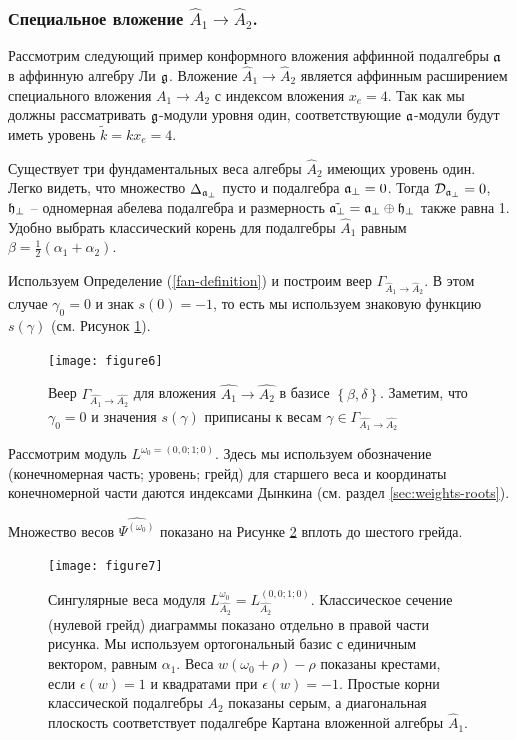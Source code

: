 \subsubsection{Специальное вложение $\hat{A}_1\rightarrow\hat{A}_2$.}
\label{sec:spec-embedd-hata_1s}
Рассмотрим следующий пример конформного вложения  аффинной подалгебры $\mathfrak{a}$ в  аффинную алгебру Ли $\mathfrak{g}$. Вложение $\hat{A}_1 \rightarrow \hat{A}_2$ является аффинным расширением специального вложения $A_1 \rightarrow A_2$ с индексом вложения $x_e=4$. Так как мы должны рассматривать $\mathfrak{g}$-модули уровня один, соответствующие  $\mathfrak{a}$-модули будут иметь уровень $\tilde{k}=kx_e=4$.

Существует три фундаментальных веса алгебры  $\hat{A}_2$ имеющих уровень один. 
Легко видеть, что множество $\Delta_{ \mathfrak{a}_{\perp} }$ пусто и подалгебра $\mathfrak{a}_{\perp}=0$. Тогда ${\cal D}_{\mathfrak{a}_{\perp}}=0$, $\mathfrak{h}_{\perp}$ -- одномерная абелева подалгебра и размерность $\tilde{\mathfrak{a}_{\perp}}=\mathfrak{a}_{\perp}\oplus \mathfrak{h}_{\perp}$ также равна 1. Удобно выбрать классический корень для подалгебры $\hat{A}_1$ равным $\beta=\frac{1}{2}(\alpha_1+\alpha_2)$.

Используем Определение (\ref{fan-definition}) и построим веер $\Gamma_{\hat A_1\to\hat A_2}$. В этом случае $\gamma_0 =0$ и знак  $s\left( 0 \right)=-1$, то есть мы используем знаковую функцию $s(\gamma)$ (см. Рисунок \ref{fig:AffineA2A1Fan}).


\begin{figure}[h!bt]
  \centering
  \texttt{[image: figure6]}

  \caption{Веер  $\Gamma_{\hat{A_1}\rightarrow \hat{A_2}}$ для вложения $\hat{A_1}\rightarrow \hat{A_2}$ в базисе $\left\{\beta,\delta \right\}$. Заметим, что  $\gamma_0 =0$ и значения $s(\gamma)$ приписаны к весам $\gamma\in \Gamma_{\hat{A_1}\rightarrow \hat{A_2}}$}
  \label{fig:AffineA2A1Fan}
\end{figure}

Рассмотрим модуль $L^{\omega_0=(0,0;1;0)}$. Здесь мы используем обозначение (конечномерная часть; уровень; грейд)
для старшего веса и координаты конечномерной части даются индексами Дынкина (см. раздел \ref{sec:weights-roots}).

Множество весов $\widehat{\Psi^{(\omega_0)}}$ показано на Рисунке \ref{fig:affine_A2_anom_point} вплоть до шестого грейда.

\begin{figure}[h!tb]
  \hspace*{-1.5cm}
  \texttt{[image: figure7]}
  \caption{Сингулярные веса модуля $L_{\hat{A_2}}^{\omega_0}=L^{(0,0;1;0)}_{\hat{A_2}}$. Классическое сечение (нулевой грейд) диаграммы показано отдельно в правой части рисунка. 
    Мы используем ортогональный базис с единичным вектором, равным $\alpha_1$. Веса $w (\omega_0+\rho)-\rho$ показаны крестами, если $\epsilon(w)=1$ и квадратами при $\epsilon(w)=-1$. Простые корни классической подалгебры  $A_2$ показаны серым, а диагональная плоскость соответствует подалгебре Картана вложенной алгебры $\hat{A}_1$.}
  \label{fig:affine_A2_anom_point}
\end{figure}

